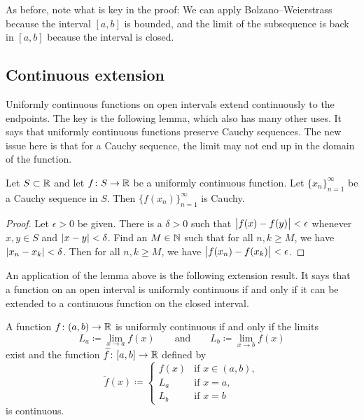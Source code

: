 As before, note what is key in the proof: We can apply Bolzano--Weierstrass
because the interval $[a,b]$ is bounded, and the limit of the subsequence is
back in $[a,b]$ because the interval is closed.

\subsection{Continuous extension}

Uniformly continuous functions on open intervals extend continuously
to the endpoints.
The key is the following lemma, which also has many other uses.
It says that uniformly continuous functions preserve Cauchy sequences.
The new issue here is that for a Cauchy sequence,
the limit may not end up in the domain of the function.

\begin{lemma} \label{unifcauchycauchy:lemma}
Let $S \subset {\mathbb{R}}$ and let $f \colon S \to {\mathbb{R}}$ be a uniformly continuous function.  Let
$\{ x_n \}_{n=1}^\infty$ be a Cauchy sequence in $S$.
Then $\bigl\{ f(x_n) \bigr\}_{n=1}^\infty$ is Cauchy.
\end{lemma}

\begin{proof}
Let $\epsilon > 0$ be given.  There is a $\delta > 0$ such that
$\bigl\lvert {f(x)-f(y)} \bigr\rvert < \epsilon$ whenever $x,y \in S$ and $\lvert {x-y} \rvert < \delta$.  Find an $M
\in {\mathbb{N}}$ such that for all $n, k \geq M$, we have $\lvert {x_n-x_k} \rvert < \delta$.
Then for all $n, k \geq M$, we have $\bigl\lvert {f(x_n)-f(x_k)} \bigr\rvert < \epsilon$.
\end{proof}

An application of the lemma above is the following extension result.  It says that
a function on an open interval is uniformly continuous if and only if
it can be extended to a continuous function on the closed interval.

\begin{prop} \label{context:prop}
A function $f \colon (a,b) \to {\mathbb{R}}$ is uniformly continuous if and only if
the limits 
\begin{equation*}
L_a \coloneqq \lim_{x \to a} f(x) \qquad \text{and} \qquad
L_b \coloneqq \lim_{x \to b} f(x)
\end{equation*}
exist and the function $\widetilde{f} \colon [a,b] \to {\mathbb{R}}$
defined by
\begin{equation*}
\widetilde{f}(x) \coloneqq
\begin{cases}
f(x) & \text{if } x \in (a,b), \\
L_a & \text{if } x = a, \\
L_b & \text{if } x = b
\end{cases}
\end{equation*}
is continuous.
\end{prop}

